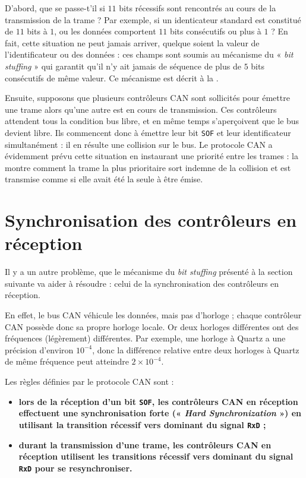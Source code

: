 D'abord, que se passe-t'il si $11$ bits récessifs sont rencontrés au cours de la transmission de la trame ? Par exemple, si un identicateur standard est constitué de $11$ bits à $1$, ou les données comportent $11$ bits consécutifs ou plus à $1$ ? En fait, cette situation ne peut jamais arriver, quelque soient la valeur de l'identificateur ou des données : ces champs sont soumis au mécanisme du « \emph{bit stuffing} » qui garantit qu'il n'y ait jamais de séquence de plus de $5$ bits consécutifs de même valeur. Ce mécanisme est décrit à la .

Ensuite, supposons que plusieurs contrôleurs CAN sont sollicités pour émettre une trame alors qu'une autre est en cours de transmission. Ces contrôleurs attendent tous la condition bus libre, et en même temps s'aperçoivent que le bus devient libre. Ils commencent donc à émettre leur bit \texttt{SOF} et leur identificateur simultanément : il en résulte une collision sur le bus. Le protocole CAN a évidemment prévu cette situation en instaurant une priorité entre les trames : la  montre comment la trame la plus prioritaire sort indemne de la collision et est transmise comme si elle avait été la seule à être émise. 








\section{Synchronisation des contrôleurs en réception}

Il y a un autre problème, que le mécanisme du \emph{bit stuffing} présenté à la section suivante va aider à résoudre : celui de la synchronisation des contrôleurs en réception.

En effet, le bus CAN véhicule les données, mais pas d'horloge ; chaque contrôleur CAN possède donc sa propre horloge locale. Or deux horloges différentes ont des fréquences (légèrement) différentes. Par exemple, une horloge à Quartz a une précision d'environ $10^{-4}$, donc la différence relative entre deux horloges à Quartz de même fréquence peut atteindre $2\times10^{-4}$.

Les règles définies par le protocole CAN sont :
\begin{itemize}
\item {\bf lors de la réception d'un bit \texttt{SOF}, les contrôleurs CAN en réception effectuent une synchronisation forte (« \emph{Hard Synchronization} ») en utilisant la transition récessif vers dominant du signal \texttt{RxD} ;} 
\item {\bf durant la transmission d'une trame, les contrôleurs CAN en réception utilisent les transitions récessif vers dominant du signal \texttt{RxD} pour se resynchroniser.} 
\end{itemize}

